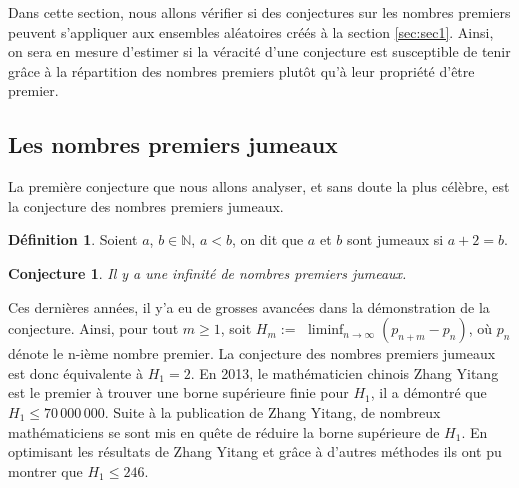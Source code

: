 \documentclass[../main.tex]{subfiles}
\begin{document}
\theoremstyle{definition}
\newtheorem{Def}{Définition}

\theoremstyle{plain}
\newtheorem{Conj}{Conjecture}

    \label{sec:test2}
    Dans cette section, nous allons vérifier si des conjectures sur les nombres premiers peuvent s'appliquer aux ensembles aléatoires créés à la section \ref{sec:sec1}. Ainsi, on sera en mesure d'estimer si la véracité d'une conjecture est susceptible de tenir grâce à la répartition des nombres premiers plutôt qu'à leur propriété d'être premier. 
 
 \subsection{Les nombres premiers jumeaux} 
 	La première conjecture que nous allons analyser, et sans doute la plus célèbre, est la conjecture des nombres premiers jumeaux.
	\begin{Def}
	Soient $a$, $b \in \mathbb{N} $, $ a < b$, on dit que $a$ et $b$ sont jumeaux si $ a + 2 = b $.
	\end{Def}  
	
	\begin{Conj}
	Il y a une infinité de nombres premiers jumeaux.
	\end{Conj}
	
	Ces dernières années, il y'a eu de grosses avancées dans la démonstration de la conjecture. Ainsi, pour tout $ m \geqslant 1$, soit $H_{m} := $ $\liminf_{n \rightarrow \infty}  (p_{n+m} - p_{n})$, où $p_{n}$ dénote le n-ième nombre premier. La conjecture des nombres premiers jumeaux est donc équivalente à $H_{1} = 2$. En 2013, le mathématicien chinois Zhang Yitang est le premier à trouver une borne supérieure finie pour $H_{1}$, il a démontré que $H_{1} \leqslant 70\, 000\, 000$. Suite à la publication de Zhang Yitang, de nombreux mathématiciens se sont mis en quête de réduire la borne supérieure de $H_{1}$. En optimisant les résultats de Zhang Yitang et grâce à d'autres méthodes ils ont pu montrer que $H_{1} \leqslant 246$.
	
\end{document}
